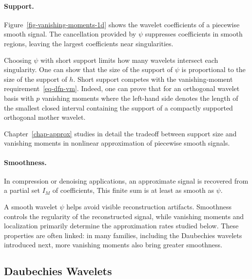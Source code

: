 \paragraph{Support.}

Figure~\ref{fig-vanishing-moments-1d} shows the wavelet coefficients of a piecewise smooth signal. The cancellation provided by $\psi$ suppresses coefficients in smooth regions, leaving the largest coefficients near singularities.


Choosing $\psi$ with short support limits how many wavelets intersect each singularity.
%
One can show that the size of the support of $\psi$ is proportional to the size of the support of $h$.
%
Short support competes with the vanishing-moment requirement~\eqref{eq-dfn-vm}. Indeed, one can prove that
for an orthogonal wavelet basis with $p$ vanishing moments
where the left-hand side denotes the length of the smallest closed interval containing the support of a compactly supported orthogonal mother wavelet.


Chapter~\ref{chap-approx} studies in detail the tradeoff between support size and vanishing moments in nonlinear approximation of piecewise smooth signals.

\paragraph{Smoothness.}

In compression or denoising applications, an approximate signal is recovered from a partial set $I_M$ of coefficients,
This finite sum is at least as smooth as $\psi$.

A smooth wavelet $\psi$ helps avoid visible reconstruction artifacts. Smoothness controls the regularity of the reconstructed signal, while vanishing moments and localization primarily determine the approximation rates studied below. These properties are often linked: in many families, including the Daubechies wavelets introduced next, more vanishing moments also bring greater smoothness.


\subsection{Daubechies Wavelets}

